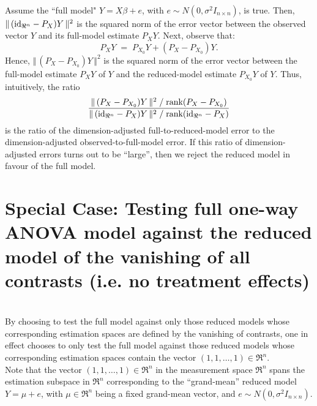 \documentclass{article}
\newcommand{\rank}{\textnormal{rank}}
\newcommand{\id}{\textnormal{id}}
\begin{document}
\begin{remark}\mbox{}\\
Assume the ``full model" $Y = X\beta + e$, with $e \sim N(0,\sigma^{2}I_{n \times n})$, is true.
Then, $\Vert\,(\id_{\Re^{n}}-P_{X})Y\,\Vert^{2}$ is the squared norm of the error vector between the observed vector $Y$ and its full-model estimate $P_{X}Y$.
Next, observe that:
\begin{equation*}
P_{X}Y \; = \; P_{X_{0}}Y + \left(P_{X} - P_{X_{0}}\right)Y.
\end{equation*}
Hence, $\Vert\,(P_{X} - P_{X_{0}})Y\,\Vert^{2}$ is the squared norm of the error vector between the full-model estimate $P_{X}Y$ of $Y$ and the reduced-model estimate $P_{X_{0}}Y$ of $Y$.  Thus, intuitively, the ratio
\begin{equation*}
\dfrac{\Vert\,(P_{X}-P_{X_{0}})Y\,\Vert^{2}\;/\;\rank(P_{X}-P_{X_{0}})}{\Vert\,(\id_{\Re^{n}}-P_{X})Y\,\Vert^{2}\;/\;\rank(\id_{\Re^{n}}-P_{X})}
\end{equation*}
is the ratio of the dimension-adjusted full-to-reduced-model error to the dimension-adjusted observed-to-full-model error.
If this ratio of dimension-adjusted errors turns out to be ``large'', then we reject the reduced model in favour of the full model.
\end{remark}


\newpage
\section{Special Case: Testing full one-way ANOVA model against the reduced model of the vanishing of all contrasts (i.e. no treatment effects)}
\setcounter{theorem}{0}

\begin{remark}\mbox{}\\
By choosing to test the full model against only those reduced models whose corresponding estimation spaces are defined by the vanishing of contrasts, one in effect chooses to only test the full model against those reduced models whose corresponding estimation spaces contain the vector $(1,1,\ldots,1) \in \Re^{n}$.\\

Note that the vector $(1,1,\ldots,1) \in \Re^{n}$ in the measurement space $\Re^{n}$ spans the estimation subspace in $\Re^{n}$ corresponding to the ``grand-mean'' reduced model $Y = \mu + e$, with $\mu \in \Re^{n}$ being a fixed grand-mean vector, and $e \sim N(0,\sigma^{2}I_{n \times n})$.
\end{remark}
\end{document}
